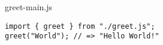 \begin{listtitle}
greet-main.js
\end{listtitle}
\begin{lstlisting}
import { greet } from "./greet.js";
greet("World"); // => "Hello World!"
\end{lstlisting}
\listend
